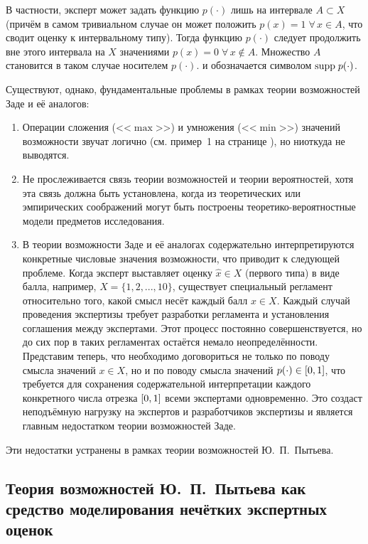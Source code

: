 В частности, эксперт может задать функцию $p(\cdot)$ лишь на интервале $A \subset X$ (причём в самом тривиальном случае он может положить $p(x) = 1\; \forall\, x \in A$, что сводит оценку к интервальному типу). Тогда функцию $p(\cdot)$ следует продолжить вне этого интервала на $X$ значениями $p(x) = 0\; \forall\, x \notin A$. Множество $A$ становится в таком случае носителем $p(\cdot)$. и обозначается символом ${\mathrm{supp}}\; p(\cdot)$.

Существуют, однако, фундаментальные проблемы в рамках теории возможностей Заде и её аналогов:
\begin{enumerate}
\item
Операции сложения (<<$\max$>>) и умножения (<<$\min$>>) значений возможности звучат логично (см. пример~1 на странице \pageref{example_zadeh}), но ниоткуда не выводятся.
\item
Не прослеживается связь теории возможностей и теории вероятностей, хотя эта связь должна быть установлена, когда из теоретических или эмпирических соображений могут быть построены теоретико-вероятностные модели предметов исследования.
\item
В теории возможности Заде и её аналогах содержательно интерпретируются конкретные числовые значения возможности, что приводит к следующей проблеме.
Когда эксперт выставляет оценку $\hat{x}  \in X$ (первого типа) в виде балла, например, $X = \{1, 2, ..., 10\}$, существует специальный регламент относительно того, какой смысл несёт каждый балл $x \in X$. Каждый случай проведения экспертизы требует разработки регламента и установления соглашения между экспертами. Этот процесс постоянно совершенствуется, но до сих пор в таких регламентах остаётся немало неопределённости. Представим теперь, что необходимо договориться не только по поводу смысла значений $x \in X$, но и по поводу смысла значений $p(\cdot) \in [0,1]$, что требуется для сохранения содержательной интерпретации каждого конкретного числа отрезка $[0,1]$ всеми экспертами одновременно. Это создаст неподъёмную нагрузку на экспертов и разработчиков экспертизы и является главным недостатком теории возможностей Заде. 
\end{enumerate}
Эти недостатки устранены в рамках теории возможностей Ю.~П.~Пытьева.

\subsection{Теория возможностей Ю.~П.~Пытьева как средство моделирования нечётких экспертных оценок}
\label{sec:math_methods_ours}

